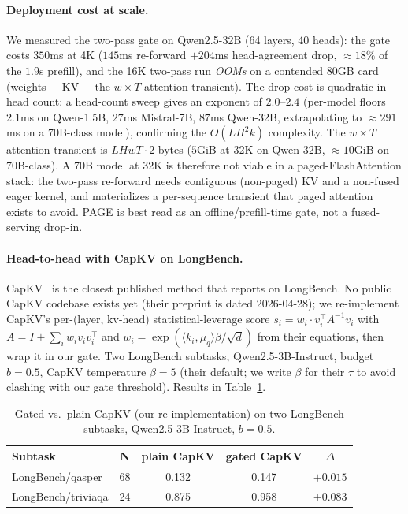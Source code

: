 \documentclass{article}
\newcommand{\method}{PAGE\xspace}
\begin{document}
\paragraph{Deployment cost at scale.} We measured the two-pass gate on
Qwen2.5-32B (64 layers, 40 heads): the gate costs $350$ms at 4K ($145$ms
re-forward $+ 204$ms head-agreement drop, $\approx 18\%$ of the $1.9$s prefill),
and the 16K two-pass run \emph{OOMs} on a contended 80GB card (weights $+$ KV
$+$ the $w \times T$ attention transient). The drop cost is quadratic in head
count: a head-count sweep gives an exponent of $2.0$--$2.4$ (per-model floors
$2.1$ms on Qwen-1.5B, $27$ms Mistral-7B, $87$ms Qwen-32B, extrapolating to
$\approx 291$ms on a 70B-class model), confirming the $O(L H^2 k)$ complexity.
The $w \times T$ attention transient is $L H w T \cdot 2$ bytes ($5$GiB at 32K
on Qwen-32B, $\approx 10$GiB on 70B-class). A 70B model at 32K is therefore not
viable in a paged-FlashAttention stack: the two-pass re-forward needs contiguous
(non-paged) KV and a non-fused eager kernel, and materializes a per-sequence
transient that paged attention exists to avoid. \method is best read as an
offline/prefill-time gate, not a fused-serving drop-in.

\paragraph{Head-to-head with CapKV on LongBench.}
CapKV~\citep{arxiv260425975} is the closest published method that
reports on LongBench. No public CapKV codebase exists yet (their
preprint is dated 2026-04-28); we re-implement CapKV's per-(layer, kv-head)
statistical-leverage score $s_i = w_i \cdot v_i^\top A^{-1} v_i$ with
$A = I + \sum_i w_i v_i v_i^\top$ and $w_i = \exp(\langle k_i,
\mu_q\rangle \beta / \sqrt d)$ from their equations,
then wrap it in our gate. Two
LongBench subtasks, Qwen2.5-3B-Instruct, budget $b = 0.5$, CapKV
temperature $\beta = 5$ (their default; we write $\beta$ for their
$\tau$ to avoid clashing with our gate threshold). Results in
Table~\ref{tab:capkv}.

\begin{table}[h]
\centering
\caption{Gated vs.\ plain CapKV (our re-implementation) on two
LongBench subtasks, Qwen2.5-3B-Instruct, $b = 0.5$.}
\label{tab:capkv}
\begin{tabular}{lcccc}
\toprule
Subtask & N & plain CapKV & gated CapKV & $\Delta$ \\
\midrule
LongBench/qasper   & 68 & 0.132 & 0.147 & $+0.015$ \\
LongBench/triviaqa & 24 & 0.875 & 0.958 & $+0.083$ \\
\bottomrule
\end{tabular}
\end{table}
\end{document}
